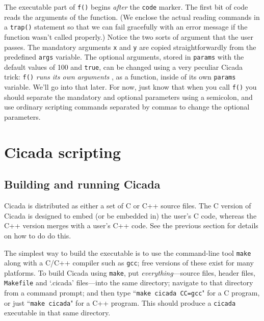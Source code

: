 \documentclass{article}
\begin{document}
The executable part of \verb#f()# begins \emph{after} the \verb#code# marker.  The first bit of code reads the arguments of the function.  (We enclose the actual reading commands in a \verb#trap()# statement so that we can fail gracefully with an error message if the function wasn't called properly.)  Notice the two sorts of argument that the user passes.  The mandatory arguments \verb#x# and \verb#y# are copied straightforwardly from the predefined \verb#args# variable.  The optional arguments, stored in \verb#params# with the default values of 100 and \verb#true#, can be changed using a very peculiar Cicada trick:  \verb#f()# \emph{runs its own arguments} , as a function, inside of its own \verb#params# variable.  We'll go into that later.  For now, just know that when you call \verb#f()# you should separate the mandatory and optional parameters using a semicolon, and use ordinary scripting commands separated by commas to change the optional parameters.

\newpage






\section{Cicada scripting}




\subsection{Building and running Cicada}

Cicada is distributed as either a set of C or C++ source files.  The C version of Cicada is designed to embed (or be embedded in) the user's C code, whereas the C++ version merges with a user's C++ code.  See the previous section for details on how to do do this.

The simplest way to build the executable is to use the command-line tool \texttt{make} along with a C/C++ compiler such as \texttt{gcc}; free versions of these exist for many platforms.  To build Cicada using \texttt{make}, put \emph{everything}---source files, header files, \texttt{Makefile} and `.cicada' files---into the same directory; navigate to that directory from a command prompt; and then type ``\texttt{make cicada CC=gcc}" for a C program, or just ``\texttt{make cicada}" for a C++ program.  This should produce a \texttt{cicada} executable in that same directory.
\end{document}
